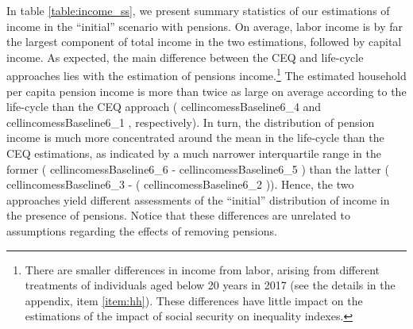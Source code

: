 \documentclass{article}
\newcommand{\cellincomessBaseline}[2]{%
  \csname cellincomessBaseline#1_#2\endcsname
}
\begin{document}
In table \ref{table:income_ss}, we present summary statistics of our estimations of income in the ``initial'' scenario with pensions. On average, labor income is by far the largest component of total income in the two estimations, followed by capital income. As expected, the main difference between the CEQ and life-cycle approaches lies with the estimation of pensions income.\footnote{There are smaller differences in income from labor, arising from  different treatments of individuals aged below 20 years in 2017 (see the details in the appendix, item \ref{item:hh}). These differences have little impact on the estimations of the impact of social security on inequality indexes.} 
The estimated household per capita pension income is more than twice as large on average  according to the life-cycle than the CEQ approach (\cellincomessBaseline{6}{4} and \cellincomessBaseline{6}{1}, respectively). In turn, the distribution of pension income is much more concentrated around the mean in the life-cycle than the CEQ estimations, as indicated by a much narrower interquartile range in the former (\cellincomessBaseline{6}{6} -\cellincomessBaseline{6}{5}) than the latter (\cellincomessBaseline{6}{3} - (\cellincomessBaseline{6}{2})). Hence, the two approaches yield different assessments of the ``initial'' distribution of income in the presence of pensions. Notice that these differences are unrelated to assumptions regarding the effects of removing pensions.        
\end{document}
